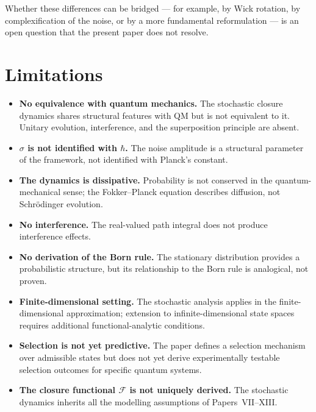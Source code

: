 \documentclass[12pt]{article}
\newcommand{\Fcal}{\mathcal{F}}
\begin{document}
Whether these differences can be bridged --- for example, by Wick rotation, by complexification of the noise, or by a more fundamental reformulation --- is an open question that the present paper does not resolve.

\section{Limitations}\label{sec:limits}

\begin{itemize}
    \item \textbf{No equivalence with quantum mechanics.} The stochastic closure dynamics shares structural features with QM but is not equivalent to it. Unitary evolution, interference, and the superposition principle are absent.
    \item \textbf{$\sigma$ is not identified with $\hbar$.} The noise amplitude is a structural parameter of the framework, not identified with Planck's constant.
    \item \textbf{The dynamics is dissipative.} Probability is not conserved in the quantum-mechanical sense; the Fokker--Planck equation describes diffusion, not Schr\"odinger evolution.
    \item \textbf{No interference.} The real-valued path integral does not produce interference effects.
    \item \textbf{No derivation of the Born rule.} The stationary distribution provides a probabilistic structure, but its relationship to the Born rule is analogical, not proven.
    \item \textbf{Finite-dimensional setting.} The stochastic analysis applies in the finite-dimensional approximation; extension to infinite-dimensional state spaces requires additional functional-analytic conditions.
    \item \textbf{Selection is not yet predictive.} The paper defines a selection mechanism over admissible states but does not yet derive experimentally testable selection outcomes for specific quantum systems.
    \item \textbf{The closure functional $\Fcal$ is not uniquely derived.} The stochastic dynamics inherits all the modelling assumptions of Papers~VII--XIII.
\end{itemize}

\end{document}
